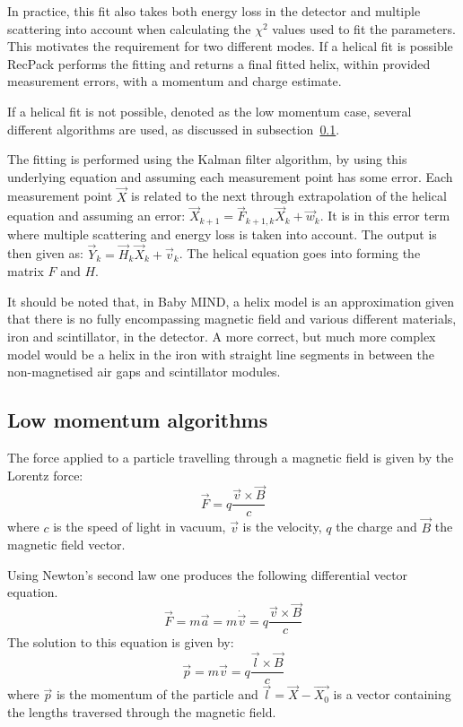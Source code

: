 In practice, this fit also takes both energy loss in the detector and multiple scattering into account when calculating the $\chi^2$ values used to fit the parameters. This motivates the requirement for two different modes. If a helical fit is possible RecPack performs the fitting and returns a final fitted helix, within provided measurement errors, with a momentum and charge estimate.

If a helical fit is not possible, denoted as the low momentum case, several different algorithms are used, as discussed in subsection~\ref{ss:lma}.

The fitting is performed using the Kalman filter algorithm, by using this underlying equation and assuming each measurement point has some error. Each measurement point $\vec{X}$ is related to the next through extrapolation of the helical equation and assuming an error: $\vec{X}_{k+1} = \vec{F}_{k+1,k}\vec{X}_k + \vec{w}_k$. It is in this error term where multiple scattering and energy loss is taken into account. The output is then given as: $\vec{Y}_{k} = \vec{H}_{k}\vec{X}_k + \vec{v}_k$. The helical equation goes into forming the matrix $F$ and $H$.

It should be noted that, in Baby MIND, a helix model is an approximation given that there is no fully encompassing magnetic field and various different materials, iron and scintillator, in the detector. A more correct, but much more complex model would be a helix in the iron with straight line segments in between the non-magnetised air gaps and scintillator modules.

\subsection{Low momentum algorithms}\label{ss:lma}
The force applied to a particle travelling through a magnetic field is given by the Lorentz force:
\begin{equation}
\vec{F}=q\frac{\vec{v}\times\vec{B}}{c}
\end{equation}
where $c$ is the speed of light in vacuum, $\vec{v}$ is the velocity, $q$ the charge and $\vec{B}$ the magnetic field vector.

Using Newton's second law one produces the following differential vector equation.
\begin{equation}
\vec{F}=m\vec{a}=m\dot{\vec{v}}=q\frac{\vec{v}\times\vec{B}}{c}
\end{equation}
The solution to this equation is given by:
\begin{equation}
\vec{p}=m\vec{v}=q\frac{\vec{l}\times\vec{B}}{c}
\end{equation} 
where $\vec{p}$ is the momentum of the particle and $\vec{l}=\vec{X}-\vec{X_0}$ is a vector containing the lengths traversed through the magnetic field.

